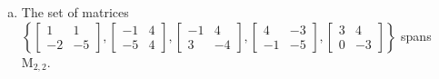 \begin{exerciseAnswer}
\begin{enumerate}[(a)]
\item The set of matrices \( \left\{ \left[\begin{array}{cc}
1 & 1 \\
-2 & -5
\end{array}\right] , \left[\begin{array}{cc}
-1 & 4 \\
-5 & 4
\end{array}\right] , \left[\begin{array}{cc}
-1 & 4 \\
3 & -4
\end{array}\right] , \left[\begin{array}{cc}
4 & -3 \\
-1 & -5
\end{array}\right] , \left[\begin{array}{cc}
3 & 4 \\
0 & -3
\end{array}\right] \right\} \) spans \(\mathrm{M}_{2,2}\). 
\end{enumerate}
    
\end{exerciseAnswer}
    
